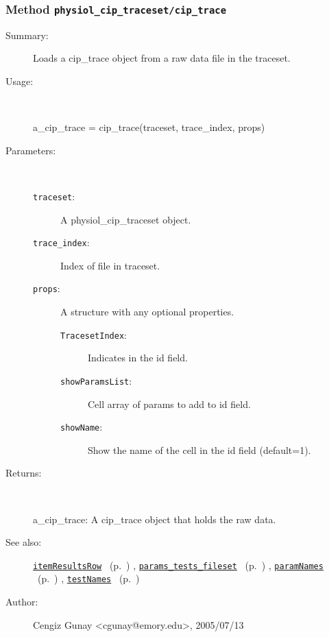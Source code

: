 \subsubsection[Method \texttt{cip\_trace}]{Method \texttt{physiol\_cip\_traceset/cip\_trace}}%
%
\label{ref_physiol_cip_traceset__cip_trace}%
\hypertarget{ref_physiol_cip_traceset__cip_trace}{}%
\begin{description}
\item[Summary:]Loads a cip\_trace object from a raw data file in the traceset.
%
\item[Usage:]~%
\begin{lyxcode}%
a\_cip\_trace = cip\_trace(traceset, trace\_index, props)
%
\end{lyxcode}%
%
%
\item[Parameters:]~
\begin{description}%
\item[\texttt{traceset}:]
 A physiol\_cip\_traceset object.
\item[\texttt{trace\_index}:]
 Index of file in traceset.
\item[\texttt{props}:]
 A structure with any optional properties.
\begin{description}%
\item[\texttt{TracesetIndex}:]
 Indicates in the id field.
\item[\texttt{showParamsList}:]
 Cell array of params to add to id field.
\item[\texttt{showName}:]
 Show the name of the cell in the id field (default=1).
\end{description}%
\end{description}%
%
\item[Returns:]~

	a\_cip\_trace: A cip\_trace object that holds the raw data.
%
%
\item[See also:]%
\hyperlink{ref_itemResultsRow}{\texttt{itemResultsRow}}%
\ (p.~\pageref{ref_itemResultsRow})%
%
, \hyperlink{ref_params_tests_fileset}{\texttt{params\_tests\_fileset}}%
\ (p.~\pageref{ref_params_tests_fileset})%
%
, \hyperlink{ref_paramNames}{\texttt{paramNames}}%
\ (p.~\pageref{ref_paramNames})%
%
, \hyperlink{ref_testNames}{\texttt{testNames}}%
\ (p.~\pageref{ref_testNames})%
%
%
\item[Author:]%
Cengiz Gunay <cgunay@emory.edu>, 2005/07/13%
\end{description}
\methodline%
